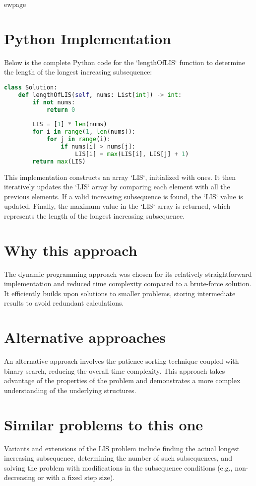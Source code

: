 ewpage %
\section*{Python Implementation}
Below is the complete Python code for the `lengthOfLIS` function to determine the length of the longest increasing subsequence:

\begin{fullwidth}
\begin{lstlisting}[language=Python]
class Solution:
    def lengthOfLIS(self, nums: List[int]) -> int:
        if not nums:
            return 0
        
        LIS = [1] * len(nums)
        for i in range(1, len(nums)):
            for j in range(i):
                if nums[i] > nums[j]:
                    LIS[i] = max(LIS[i], LIS[j] + 1)
        return max(LIS)
\end{lstlisting}

\end{fullwidth}

This implementation constructs an array `LIS`, initialized with ones. It then iteratively updates the `LIS` array by comparing each element with all the previous elements. If a valid increasing subsequence is found, the `LIS` value is updated. Finally, the maximum value in the `LIS` array is returned, which represents the length of the longest increasing subsequence.

\section*{Why this approach}
The dynamic programming approach was chosen for its relatively straightforward implementation and reduced time complexity compared to a brute-force solution. It efficiently builds upon solutions to smaller problems, storing intermediate results to avoid redundant calculations.

\section*{Alternative approaches}
An alternative approach involves the patience sorting technique coupled with binary search, reducing the overall time complexity. This approach takes advantage of the properties of the problem and demonstrates a more complex understanding of the underlying structures.

\section*{Similar problems to this one}
Variants and extensions of the LIS problem include finding the actual longest increasing subsequence, determining the number of such subsequences, and solving the problem with modifications in the subsequence conditions (e.g., non-decreasing or with a fixed step size).

